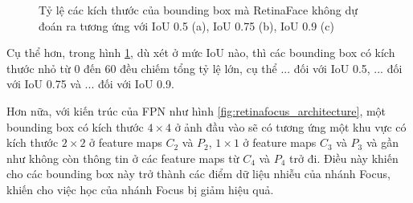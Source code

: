 {    \begin{figure}[H]
        \centering
        \caption{Tỷ lệ các kích thước của bounding box mà RetinaFace không dự đoán ra tương ứng với IoU 0.5 (a), IoU 0.75 (b), IoU 0.9 (c)}
        \label{fig:retinafocus_iou_lower}
    \end{figure}

    \noindent
    Cụ thể hơn, trong hình \ref{fig:retinafocus_iou_lower}, dù xét ở mức IoU nào, thì các bounding box có kích thước nhỏ từ 0 đến 60 đều chiếm tổng tỷ lệ lớn, cụ thể ... đối với IoU 0.5, ... đối với IoU 0.75 và ... đối với IoU 0.9.

    \noindent
    Hơn nữa, với kiến trúc của FPN như hình \ref{fig:retinafocus_architecture}, một bounding box có kích thước $4 \times 4$ ở ảnh đầu vào sẽ có tương ứng một khu vực có kích thước $2 \times 2$ ở feature maps ${C}_{2}$ và ${P}_{2}$, $1 \times 1$ ở feature maps ${C}_{3}$ và ${P}_{3}$ và gần như không còn thông tin ở các feature maps từ ${C}_{4}$ và ${P}_{4}$ trở đi.
    Điều này khiến cho các bounding box này trở thành các điểm dữ liệu nhiễu của nhánh Focus, khiến cho việc học của nhánh Focus bị giảm hiệu quả.

}
